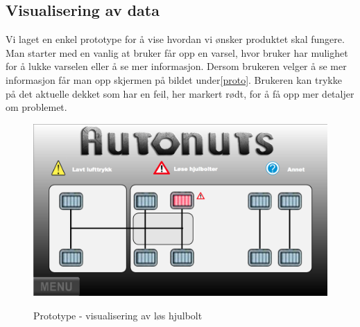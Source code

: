 \subsection{Visualisering av data}
Vi laget en enkel prototype for å vise hvordan vi ønsker produktet skal fungere. Man starter med en vanlig at bruker får opp en varsel, hvor bruker har mulighet for å lukke varselen eller å se mer informasjon. Dersom brukeren velger å se mer informasjon får man opp skjermen på bildet under\ref{proto}. Brukeren kan trykke på det aktuelle dekket som har en feil, her markert rødt, for å få opp mer detaljer om problemet.
\begin{figure}[H]
		\centering
		\includegraphics[width=1.00\textwidth]{images/prototype.png}
		\label{fig:proto}
		\caption{Prototype - visualisering av løs hjulbolt}
	\end{figure}
